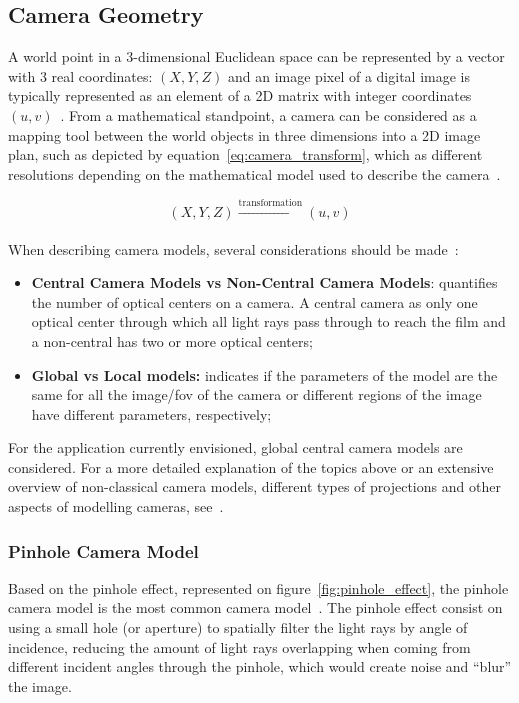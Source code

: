 \subsection{Camera Geometry}
A world point in a 3-dimensional Euclidean space can be represented by a vector with 3 real coordinates: $(X, Y, Z)$ and an image pixel of a digital image is typically represented as an element of a 2D matrix with integer coordinates $(u, v)$~\cite{mvg_book}. From a mathematical standpoint, a camera can be considered as a mapping tool between the world objects in three dimensions into a 2D image plan, such as depicted by equation~\ref{eq:camera_transform}, which as different resolutions depending on the mathematical model used to describe the camera~\cite{mvg_book, Sturm2010}.

\begin{equation}
	\label{eq:camera_transform}
	(X, Y, Z) \xrightarrow[]{\text{transformation}} (u, v)
\end{equation}

When describing camera models, several considerations should be made~\cite{Sturm2010}:
\begin{itemize}
	\item \textbf{Central Camera Models vs Non-Central Camera Models}: quantifies the number of optical centers on a camera. A central camera as only one optical center through which all light rays pass through to reach the film and a non-central has two or more optical centers;
	\item \textbf{Global vs Local models:} indicates if the parameters of the model are the same for all the image/\ac{fov} of the camera or different regions of the image have different parameters, respectively;
\end{itemize}

For the application currently envisioned, global central camera models are considered. For a more detailed explanation of the topics above or an extensive overview of non-classical camera models, different types of projections and other aspects of modelling cameras, see~\cite{Sturm2010, camera_models}.

\subsubsection{Pinhole Camera Model}
Based on the pinhole effect, represented on figure~\ref{fig:pinhole_effect}, the pinhole camera model is the most common camera model~\cite{camera_models}. The pinhole effect consist on using a small hole (or aperture) to spatially filter the light rays by angle of incidence, reducing the amount of light rays overlapping when coming from different incident angles through the pinhole, which would create noise and ``blur'' the image. 

